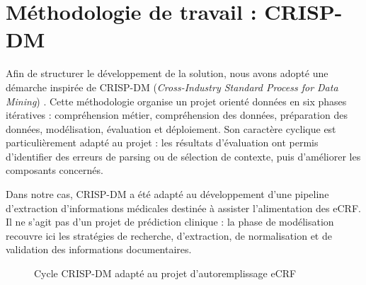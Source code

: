 \section{Méthodologie de travail : CRISP-DM}
Afin de structurer le développement de la solution, nous avons adopté une démarche inspirée de CRISP-DM (\emph{Cross-Industry Standard Process for Data Mining}) \cite{crispdm}. Cette méthodologie organise un projet orienté données en six phases itératives : compréhension métier, compréhension des données, préparation des données, modélisation, évaluation et déploiement. Son caractère cyclique est particulièrement adapté au projet : les résultats d'évaluation ont permis d'identifier des erreurs de parsing ou de sélection de contexte, puis d'améliorer les composants concernés.

Dans notre cas, CRISP-DM a été adapté au développement d'une pipeline d'extraction d'informations médicales destinée à assister l'alimentation des eCRF. Il ne s'agit pas d'un projet de prédiction clinique : la phase de modélisation recouvre ici les stratégies de recherche, d'extraction, de normalisation et de validation des informations documentaires.

\begin{figure}[H]
\centering
{}
\caption{Cycle CRISP-DM adapté au projet d'autoremplissage eCRF}
\label{fig:crispdm}
\end{figure}

